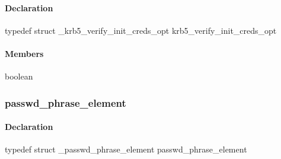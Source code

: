 \documentclass[letterpaper,10pt,english]{sphinxmanual}
\begin{document}
\paragraph{Declaration}
\label{appdev/refs/types/krb5_verify_init_creds_opt:declaration}
typedef struct \_krb5\_verify\_init\_creds\_opt  krb5\_verify\_init\_creds\_opt


\paragraph{Members}
\label{appdev/refs/types/krb5_verify_init_creds_opt:members}

\begin{fulllineitems}
\label{appdev/refs/types/krb5_verify_init_creds_opt:krb5_verify_init_creds_opt.flags}
\end{fulllineitems}


\begin{fulllineitems}
\label{appdev/refs/types/krb5_verify_init_creds_opt:krb5_verify_init_creds_opt.ap_req_nofail}
boolean

\end{fulllineitems}



\subsubsection{passwd\_phrase\_element}
\label{appdev/refs/types/passwd_phrase_element:passwd-phrase-element-struct}\label{appdev/refs/types/passwd_phrase_element::doc}\label{appdev/refs/types/passwd_phrase_element:passwd-phrase-element}

\begin{fulllineitems}
\label{appdev/refs/types/passwd_phrase_element:passwd_phrase_element}
\end{fulllineitems}



\paragraph{Declaration}
\label{appdev/refs/types/passwd_phrase_element:declaration}
typedef struct \_passwd\_phrase\_element  passwd\_phrase\_element
\end{document}
